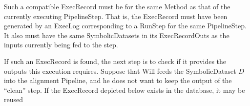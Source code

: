 \documentclass[12pt]{article}
\begin{document}
Such a compatible ExecRecord must be for the same Method as that of the
currently executing PipelineStep. That is, the ExecRecord must have been
generated by an ExecLog corresponding to a RunStep for the same PipelineStep.
It also must have the same SymbolicDatasets in its ExecRecordOuts as the inputs 
currently being fed to the step.

If such an ExecRecord is found, the next step is to check if it provides the
outputs this execution requires. Suppose that Will feeds the SymbolicDataset
$D$ into the alignment Pipeline, and he does not want to keep the output of the
``clean'' step. If the ExecRecord depicted below exists in the database, it may
be reused
\end{document}
